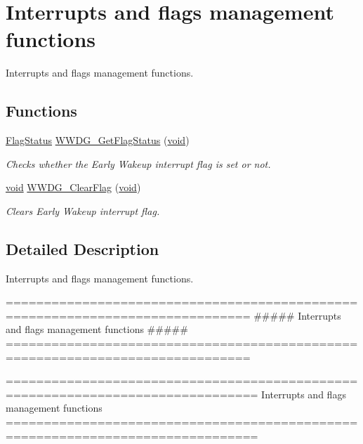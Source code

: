 \hypertarget{group___w_w_d_g___group3}{\section{Interrupts and flags management functions}
\label{group___w_w_d_g___group3}
}


Interrupts and flags management functions.  


\subsection*{Functions}
\begin{DoxyCompactItemize}
\item 
\hyperlink{group___exported__types_ga89136caac2e14c55151f527ac02daaff}{Flag\-Status} \hyperlink{group___w_w_d_g___group3_ga7df4882d45918b9b8249dfca1e44fabc}{W\-W\-D\-G\-\_\-\-Get\-Flag\-Status} (\hyperlink{group___n_a_m_e_ga18028b8badbf1ea7e704ccac3c488e82}{void})
\begin{DoxyCompactList}\small\item\em Checks whether the Early Wakeup interrupt flag is set or not. \end{DoxyCompactList}\item 
\hyperlink{group___n_a_m_e_ga18028b8badbf1ea7e704ccac3c488e82}{void} \hyperlink{group___w_w_d_g___group3_gabd2b5a6317c2e1a3ab0795838ce59dd2}{W\-W\-D\-G\-\_\-\-Clear\-Flag} (\hyperlink{group___n_a_m_e_ga18028b8badbf1ea7e704ccac3c488e82}{void})
\begin{DoxyCompactList}\small\item\em Clears Early Wakeup interrupt flag. \end{DoxyCompactList}\end{DoxyCompactItemize}


\subsection{Detailed Description}
Interrupts and flags management functions. \begin{DoxyVerb}  ==============================================================================
              ##### Interrupts and flags management functions #####
  ==============================================================================  \end{DoxyVerb}


\begin{DoxyVerb} ===============================================================================
                 Interrupts and flags management functions
 ===============================================================================  \end{DoxyVerb}
 

